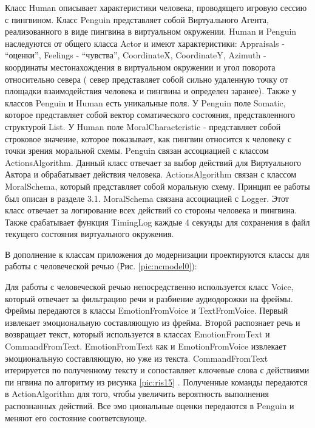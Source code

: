 Класс Human описывает характеристики человека, проводящего игровую сессию с пингвином. 
Класс Penguin представляет собой Виртуального Агента, реализованного в виде пингвина в виртуальном окружении. 
Human и Penguin наследуются от общего класса Actor и имеют характеристики: Appraisals - “оценки”, Feelings - “чувства”, 
CoordinateX, CoordinateY, Azimuth - координаты местонахождения в виртуальном окружении и угол поворота относительно севера (
север представляет собой сильно удаленную точку от площадки взаимодействия человека и пингвина и определен заранее).  
Также у классов Penguin и Human есть уникальные поля. У Penguin поле Somatic, которое представляет собой вектор соматического состояния, 
представленного структурой List. У Human поле MoralCharacteristic - представляет собой строковое значение, которое показывает, 
как пингвин относится к человеку с точки зрения моральной схемы. Penguin связан ассоциацией с классом ActionsAlgorithm. 
Данный класс отвечает за выбор действий для Виртуального Актора и обрабатывает действия человека. ActionsAlgorithm связан с классом MoralSchema, 
который представляет собой моральную схему. Принцип ее работы был описан в разделе 3.1. MoralSchema связана ассоциацией с Logger. 
Этот класс отвечает за логирование всех действий со стороны человека и пингвина. Также срабатывает функция TimingLog каждые 4 
секунды для сохранения в файл текущего состояния виртуального окружения.

В дополнение к классам приложения до модернизации проектируются классы для работы с человеческой речью (Рис. \ref{pic:ncmodel0}):

Для работы с человеческой речью непосредственно используется класс Voice, который отвечает за фильтрацию речи и разбиение аудиодорожки на фреймы. 
Фреймы передаются в классы EmotionFromVoice   
и TextFromVoice. Первый извлекает эмоциональную составляющую из фрейма. Второй распознает речь   
и возвращает текст, который используется в классах EmotionFromText и CommandFromText.   
EmotionFromText как и EmotionFromVoice извлекает эмоциональную составляющую, но уже из текста. 
CommandFromText итерируется по полученному тексту и сопоставляет ключевые слова с действиями пи  
нгвина по алгоритму из рисунка \ref{pic:ris15} . Полученные команды передаются в   
ActionAlgorithm для того, чтобы увеличить вероятность выполнения распознанных действий. Все эмо  
циональные оценки передаются в Penguin и меняют его состояние соответсвующе.

